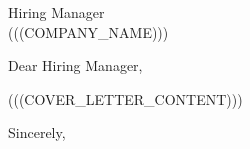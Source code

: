 \documentclass[11pt,a4paper]{letter}
\begin{document}
\begin{letter}{Hiring Manager \\ (((COMPANY_NAME)))}

\opening{Dear Hiring Manager,}

(((COVER_LETTER_CONTENT)))

\closing{Sincerely,}

\end{letter}
\end{document}
